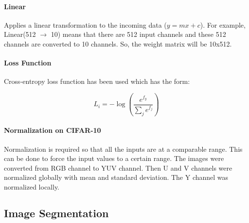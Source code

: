  \paragraph{Linear}
 Applies a linear transformation to the incoming data ($y = mx + c$). For example, Linear(512 \(\rightarrow\) 10) means that there are 512 input channels and these 512 channels are converted to 10 channels. So, the weight matrix will be 10x512. 
 
 
 \paragraph{Loss Function}
 Cross-entropy loss function has been used which has the form:
 
 
$$ L_{i} = -\log{(\frac{e^{f_y}}{\sum_j{e^{f_j}}})}$$

\paragraph{Normalization on CIFAR-10}

Normalization is required so that all the inputs are at a comparable range. This can be done to force the input values to a certain range. The images were converted from RGB channel to YUV channel. Then U and V channels were normalized globally with mean and standard deviation. The Y channel was normalized locally.

\subsection{Image Segmentation}
